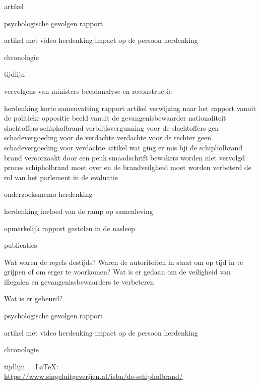 \cite{schipholbrand27102005video}
artikel

\cite{schipholbrand27102005video}
psychologische gevolgen
rapport

\cite{onderzoeksraad2610schipholoost}
artikel met video
herdenking
impact op de persoon
herdenking

\cite{schipholbrandvideoargos}
chronologie

\cite{nunl30052023feitenoverzicht}
tijdlijn


vervolgens van ministers
beeldanalyse en reconstructie

\cite{}
herdenking
korte samenvatting
rapport
artikel
verwijzing naar het rapport vanuit de politieke oppositie
beeld vanuit de gevangenisbewaarder
nationaliteit slachtoffers schipholbrand
verblijfsvergunning voor de slachtoffers
gen schadevergoeding voor de verdachte
verdachte voor de rechter
geen schadevergoeding voor verdachte
artikel wat ging er mis bji de schipholbrand
brand veroorzaakt door een peuk
smaadschrift
bewakers worden niet vervolgd
proces schipholbrand moet over en de brandveilgheid moet worden verbeterd
de rol van het parlement in de evaluatie

\cite{parlementairemonitorschipholbrand}
onderzoeksmemo
herdenking

herdenking
invloed van de ramp op samenleving

\cite{videonpoNOVA13112008}
opmerkelijk rapport gestolen in de nasleep

\cite{rizoomes01052014schipholbrand}


publicaties


\cite{heuvelkroesschipholbrandcamerabeelden}
Wat waren de regels destijds?
Waren de autoriteiten in staat om op tijd in te grijpen of om erger te voorkomen?
Wat is er gedaan om de veiligheid van illegalen en gevangenissbewaarders te verbeteren


 


Wat is er gebeurd?
\cite{wikiSchipholbrand}


\cite{schipholbrand27102005video}
 

psychologische gevolgen
rapport

\cite{onderzoeksraad2610schipholoost}
artikel met video
herdenking
impact op de persoon
herdenking

\cite{schipholbrandvideoargos}
chronologie

\cite{nunl30052023feitenoverzicht}
tijdlijn
 ... \LaTeX:\\ \url{https://www.singeluitgeverijen.nl/isbn/de-schipholbrand/}

